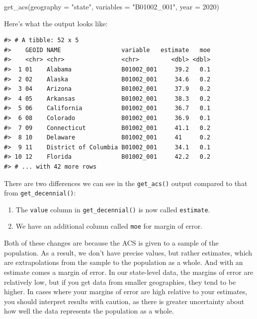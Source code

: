 \documentclass[
]{book}
\newenvironment{Shaded}{\begin{snugshade}}{\end{snugshade}}
\newcommand{\AttributeTok}[1]{\textcolor[rgb]{0.77,0.63,0.00}{#1}}
\newcommand{\DecValTok}[1]{\textcolor[rgb]{0.00,0.00,0.81}{#1}}
\newcommand{\FunctionTok}[1]{\textcolor[rgb]{0.00,0.00,0.00}{#1}}
\newcommand{\NormalTok}[1]{#1}
\newcommand{\StringTok}[1]{\textcolor[rgb]{0.31,0.60,0.02}{#1}}
\providecommand{\tightlist}{%
  \setlength{\itemsep}{0pt}\setlength{\parskip}{0pt}}
\begin{document}
\begin{Shaded}
\begin{Highlighting}[]
\FunctionTok{get\_acs}\NormalTok{(}\AttributeTok{geography =} \StringTok{"state"}\NormalTok{,}
        \AttributeTok{variables =} \StringTok{"B01002\_001"}\NormalTok{,}
        \AttributeTok{year =} \DecValTok{2020}\NormalTok{)}
\end{Highlighting}
\end{Shaded}

Here's what the output looks like:

\begin{verbatim}
#> # A tibble: 52 x 5
#>    GEOID NAME                 variable   estimate   moe
#>    <chr> <chr>                <chr>         <dbl> <dbl>
#>  1 01    Alabama              B01002_001     39.2   0.1
#>  2 02    Alaska               B01002_001     34.6   0.2
#>  3 04    Arizona              B01002_001     37.9   0.2
#>  4 05    Arkansas             B01002_001     38.3   0.2
#>  5 06    California           B01002_001     36.7   0.1
#>  6 08    Colorado             B01002_001     36.9   0.1
#>  7 09    Connecticut          B01002_001     41.1   0.2
#>  8 10    Delaware             B01002_001     41     0.2
#>  9 11    District of Columbia B01002_001     34.1   0.1
#> 10 12    Florida              B01002_001     42.2   0.2
#> # ... with 42 more rows
\end{verbatim}

There are two differences we can see in the \texttt{get\_acs()} output compared to that from \texttt{get\_decennial()}:

\begin{enumerate}
\def\labelenumi{\arabic{enumi}.}
\tightlist
\item
  The \texttt{value} column in \texttt{get\_decennial()} is now called \texttt{estimate}.
\item
  We have an additional column called \texttt{moe} for margin of error.
\end{enumerate}

Both of these changes are because the ACS is given to a sample of the population. As a result, we don't have precise values, but rather estimates, which are extrapolations from the sample to the population as a whole. And with an estimate comes a margin of error. In our state-level data, the margins of error are relatively low, but if you get data from smaller geographies, they tend to be higher. In cases where your margins of error are high relative to your estimates, you should interpret results with caution, as there is greater uncertainty about how well the data represents the population as a whole.
\end{document}
